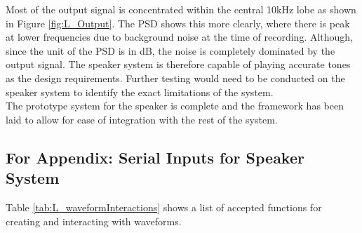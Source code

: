 \documentclass[12pt, a4paper]{article}
\begin{document}
Most of the output signal is concentrated within the central 10kHz lobe as shown in Figure \ref{fig:L_Output}. The PSD shows this more clearly, where there is peak at lower frequencies due to background noise at the time of recording. Although, since the unit of the PSD is in dB, the noise is completely dominated by the output signal. The speaker system is therefore capable of playing accurate tones as the design requirements. Further testing would need to be conducted on the speaker system to identify the exact limitations of the system. \\

The prototype system for the speaker is complete and the framework has been laid to allow for ease of integration with the rest of the system. \\
\pagebreak
\subsection{For Appendix: Serial Inputs for Speaker System}
\label{sec:l_append}
Table \ref{tab:L_waveformInteractions} shows a list of accepted functions for creating and interacting with waveforms. \\
\end{document}

